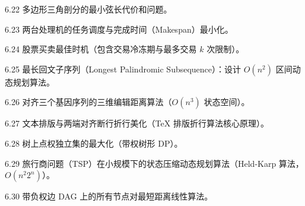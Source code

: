 \begin{exercise}{6.22}
多边形三角剖分的最小弦长代价和问题。
\end{exercise}

\begin{exercise}{6.23}
两台处理机的任务调度与完成时间（Makespan）最小化。
\end{exercise}

\begin{exercise}{6.24}
股票买卖最佳时机（包含交易冷冻期与最多交易 $k$ 次限制）。
\end{exercise}

\begin{exercise}{6.25}
最长回文子序列（Longest Palindromic Subsequence）：设计 $O(n^2)$ 区间动态规划算法。
\end{exercise}

\begin{exercise}{6.26}
对齐三个基因序列的三维编辑距离算法（$O(n^3)$ 状态空间）。
\end{exercise}

\begin{exercise}{6.27}
文本排版与两端对齐断行折行美化（TeX 排版折行算法核心原理）。
\end{exercise}

\begin{exercise}{6.28}
树上点权独立集的最大化（带权树形 DP）。
\end{exercise}

\begin{exercise}{6.29}
旅行商问题（TSP）在小规模下的状态压缩动态规划算法（Held-Karp 算法，$O(n^2 2^n)$）。
\end{exercise}

\begin{exercise}{6.30}
带负权边 DAG 上的所有节点对最短距离线性算法。
\end{exercise}
